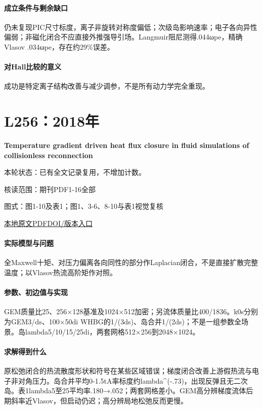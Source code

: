 \paragraph{成立条件与剩余缺口}仍未复现PIC尺寸标度，离子非旋转对称度偏低；次级岛影响速率；电子各向异性偏弱；非磁化闭合不应直接外推强导引场。Langmuir阻尼测得.044ωpe，精确Vlasov .034ωpe，存在约29\%误差。

\paragraph{对Hall比较的意义}成功是特定离子结构改善与减少调参，不是所有动力学完全重现。

\section{L256：2018年}\label{paper:L256}

\textbf{Temperature gradient driven heat flux closure in fluid simulations of collisionless reconnection}\citep{L256}

\textsf{本轮状态：}已有全文记录复用，不增加计数。

\textsf{核读范围：}期刊PDF1-16全部\par\textsf{图式：}图1-10及表1；图1、3-6、8-10与表1视觉复核

\href{run:../../papers/L256.pdf}{本地原文PDF}\quad\href{https://doi.org/10.1017/s002237781800048x}{DOI/版本入口}

\paragraph{实际模型与问题}全Maxwell十矩、对压力偏离各向同性的部分作Laplacian闭合，不是直接扩散完整温度；以Vlasov热流高阶矩作对照。

\paragraph{参数、初边值与实现}GEM质量比25、256×128基准及1024×512加密；另流体质量比400/1836。k0s分别为GEM3/ds、100×50di WHBG的1/(3ds)、岛合并1/(2ds)；不是一组参数全场景。岛lambda5/10/15/25di，两套网格512×256到2048×1024。

\paragraph{求解得到什么}原松弛闭合的热流散度形状和符号在某些区域错误；梯度闭合改善上游假热流与电子非对角压力。岛合并平均0-1.5tA率标度约lambda\textasciicircum{}(-.73)，出现反弹且无二次岛。表1lambda5至25平均率.180→.052；两套网格差小。GEM高分辨梯度流体后期斜率近Vlasov，但启动仍迟；高分辨局地松弛反而更慢。

